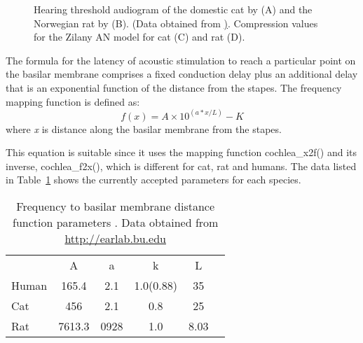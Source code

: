 \begin{figure}[htb]
  \begin{center}
\caption[Audiogram and compression in rats and cats]%
{Hearing threshold audiogram of the domestic cat by
  \citet{HeffnerHeffner:1985} (A) and the Norwegian rat by
  \citet{HeffnerHeffner:1985} (B).  (Data obtained from
  \href{earlab.bu.edu}).  Compression values for the Zilany AN model
  for cat (C) and rat (D).}
\label{fig:AudThresholdCatRat}
  \end{center}
\end{figure}



The formula for the latency of acoustic stimulation to reach a
particular point on the basilar membrane comprises a fixed conduction
delay plus an additional delay that is an exponential function of the
distance from the stapes.  The frequency mapping function is defined
as:
\begin{equation}
  \label{eq:BM}
  f(x) = A\times10^{\left(a * x / L\right)} - K
\end{equation}
\noindent where \emph{x} is distance along the basilar membrane from
the stapes.


This equation is suitable since it uses the mapping function
\mbox{\textsf{cochlea\_x2f()}} and its inverse,
\mbox{\textsf{cochlea\_f2x()}}, which is different for cat, rat and
humans.  The data listed in Table~\ref{tab:f2x} shows the currently
accepted parameters for each species.


\begin{table}[ht]
  \centering
  \begin{tabular}{lccccc}
  \hline
      &   A  &  a   &     k     & L \\
Human & 165.4 & 2.1  & 1.0(0.88) & 35\\
 Cat  &  456  & 2.1  &    0.8    & 25 \\
 Rat  & 7613.3& 0928 &    1.0    & 8.03 \\
  \hline
  \end{tabular}
  \caption[Basilar membrane frequency-distance function parameters]%
  {Frequency to basilar membrane distance function parameters \citep{FitzGeraldBurkittEtAl:2001}. Data obtained from \url{http://earlab.bu.edu} \label{tab:f2x}}
\end{table}


